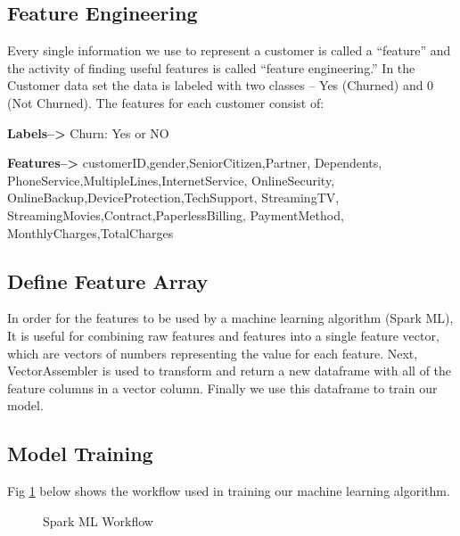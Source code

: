 \documentclass[9pt,twocolumn,twoside]{../../styles/osajnl}
\begin{document}
	\subsection{Feature Engineering}
		Every single information we use to represent a customer is called a “feature” and the activity of finding useful features is called “feature engineering.” In the Customer data set the data is labeled with two classes – Yes (Churned) and 0
		(Not Churned). The features for each customer consist of:
		\begin{description}
			\item \textbf{Labels-->} Churn: Yes or NO
			\item \textbf{Features-->} customerID,gender,SeniorCitizen,Partner,
			Dependents, PhoneService,MultipleLines,InternetService,
			OnlineSecurity,
			OnlineBackup,DeviceProtection,TechSupport,
			StreamingTV,
			StreamingMovies,Contract,PaperlessBilling,
			PaymentMethod,
			MonthlyCharges,TotalCharges		
		\end{description}

	\subsection{Define Feature Array}
		In order for the features to be used by a machine learning algorithm (Spark ML), It is useful for combining raw features and features into a single feature vector, which are vectors of numbers representing the value for each feature. Next, VectorAssembler\cite{VectorAssembler} is used to transform and return a new dataframe with all of the feature columns in a vector column. Finally we use this dataframe to train our model.

	\subsection{Model Training}

	Fig \ref{Workflow} below shows the workflow used in training our machine learning algorithm.

		\begin{figure}[htbp]
		\centering
		\caption{Spark ML Workflow \cite{ML-Workflow}}
		\label{Workflow}
		\end{figure}
\end{document}
